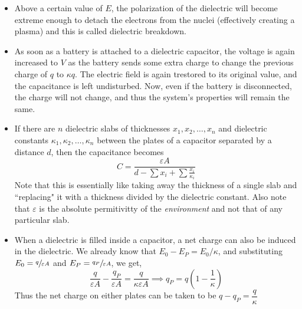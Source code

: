 \documentclass{scrartcl}
\begin{document}
\begin{itemize}
        \item Above a certain value of $E$, the polarization of the dielectric will become extreme enough to detach the electrons from the nuclei (effectively creating a plasma) and this is called dielectric breakdown.
        \item As soon as a battery is attached to a dielectric capacitor, the voltage is again increased to $V$ as the battery sends some extra charge to change the previous charge of $q$ to $\kappa q$. The electric field is again trestored to its original value, and the capacitance is left undisturbed. Now, even if the battery is disconnected, the charge will not change, and thus the system's properties will remain the same.
        \item If there are $n$ dielectric slabs of thicknesses $x_1,x_2,\dots,x_n$ and dielectric constants $\kappa_1,\kappa_2,\dots,\kappa_n$ between the plates of a capacitor separated by a distance $d$, then the capacitance becomes \[\boxed{C=\frac{\varepsilon A}{d-\sum x_i+\sum\frac{x_i}{\kappa_i}}}\] Note that this is essentially like taking away the thickness of a single slab and ``replacing" it with a thickness divided by the dielectric constant. Also note that $\varepsilon$ is the absolute permitivitty of the \textit{environment} and not that of any particular slab.
        \item When a dielectric is filled inside a capacitor, a net charge can also be induced in the dielectric. We already know that $E_0-E_P=E_0/\kappa$, and substituting $E_0=\sfrac q{\varepsilon A}$ and $E_P=\sfrac{q_P}{\varepsilon A}$, we get,\[\frac q{\varepsilon A}-\frac{q_P}{\varepsilon A}=\frac q{\kappa\varepsilon A}\implies\boxed{q_P=q\left(1-\frac1\kappa\right)}\] Thus the net charge on either plates can be taken to be $\boxed{q-q_P=\dfrac q\kappa}$
    \end{itemize}
\end{document}
